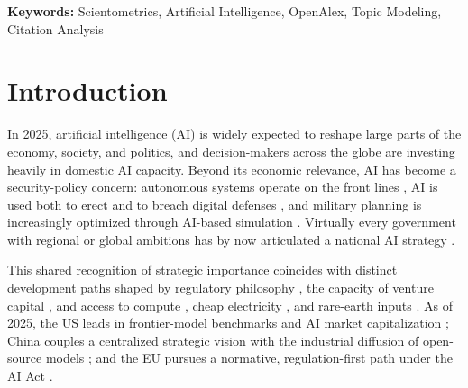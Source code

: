 \documentclass{article}
\let\cite\parencite
\begin{document}
	\begin{center}
		\textbf{Keywords:} Scientometrics, Artificial Intelligence, OpenAlex, Topic Modeling, Citation Analysis
	\end{center}
	
\vspace{1em}

\setcounter{page}{1}

\begingroup
\renewcommand{\contentsname}{\normalfont\large\bfseries Contents}
\setcounter{tocdepth}{2}   %
\tableofcontents
\endgroup
\vspace{1em}

\twocolumn
	
	\section{Introduction}
	
	In 2025, artificial intelligence (AI) is widely expected to reshape large parts of the economy, society, and politics, and decision-makers across the globe are investing heavily in domestic AI capacity. Beyond its economic relevance, AI has become a security-policy concern: autonomous systems operate on the front lines \cite{onderco2025aifrontierNATO}, AI is used both to erect and to breach digital defenses \cite{salem2024aicybersecurityreview, vance2023geopolitical}, and military planning is increasingly optimized through AI-based simulation \cite{basuchoudhary2025aiwarfare}. Virtually every government with regional or global ambitions has by now articulated a national AI strategy \cite{sabouri2024newgeopolitics}.
	
	This shared recognition of strategic importance coincides with distinct development paths shaped by regulatory philosophy \cite{wang2025artificial}, the capacity of venture capital \cite{montanaro2024venture}, and access to compute \cite{lehdonvirta2025compute}, cheap electricity \cite{lin2024exploding}, and rare-earth inputs \cite{fan2023geopolitics}. As of 2025, the US leads in frontier-model benchmarks and AI market capitalization \cite{sastry2024computing}; China couples a centralized strategic vision with the industrial diffusion of open-source models \cite{khanal2024development}; and the EU pursues a normative, regulation-first path under the AI Act \cite{balcioglu2025turning}.
	
\end{document}
